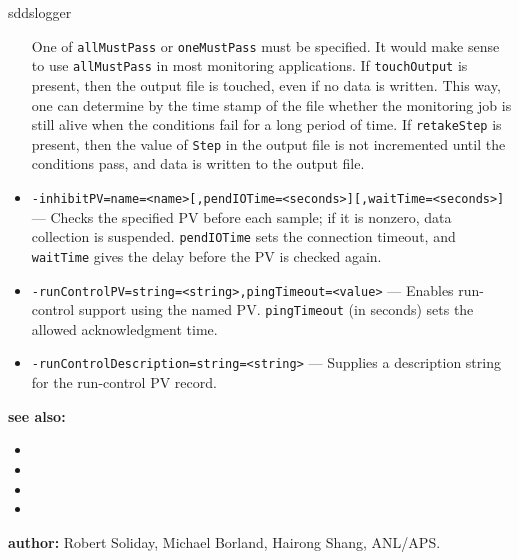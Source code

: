 \begin{sddsprog}{sddslogger}
\begin{itemize}
      One of \verb+allMustPass+ or \verb+oneMustPass+ must be specified. It would make sense
      to use \verb+allMustPass+ in most monitoring applications.
      If \verb+touchOutput+ is present, then the output file is touched, even if no data
      is written. This way, one can determine by the time stamp of the file
      whether the monitoring job is still alive
      when the conditions fail for a long period of time. If \verb+retakeStep+ is
      present, then the value of \verb+Step+ in the output file is not
      incremented until the conditions pass, and data is written to the output file.
  \item {\tt -inhibitPV=name=<name>[,pendIOTime=<seconds>][,waitTime=<seconds>]} ---
      Checks the specified PV before each sample; if it is nonzero, data collection
      is suspended. \verb+pendIOTime+ sets the connection timeout, and \verb+waitTime+
      gives the delay before the PV is checked again.
  \item {\tt -runControlPV=string=<string>,pingTimeout=<value>} --- Enables run-control
      support using the named PV. \verb+pingTimeout+ (in seconds) sets the allowed
      acknowledgment time.
  \item {\tt -runControlDescription=string=<string>} --- Supplies a description string
      for the run-control PV record.
\end{itemize}

\item \textbf{see also:}
\begin{itemize}
  \item {}
  \item {}
  \item {}
  \item {}
\end{itemize}
\item \textbf{author:} Robert Soliday, Michael Borland, Hairong Shang, ANL/APS.
\end{sddsprog}
